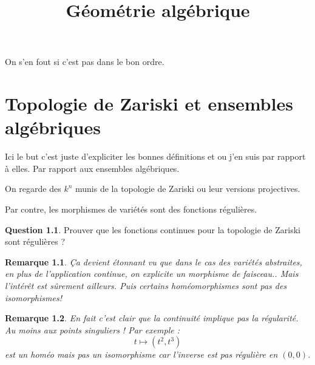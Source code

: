 \documentclass[a4paper,12pt]{book}
\title{Géométrie algébrique}
\date{}
\theoremstyle{plain}
\newtheorem{rem}{Remarque}
\theoremstyle{definition}
\newtheorem{quest}{Question}
\theoremstyle{remark}
\begin{document}
\maketitle
\tableofcontents


On s'en fout si c'est pas dans le bon ordre.
\chapter{Topologie de Zariski et ensembles algébriques}
Ici le but c'est juste d'expliciter les bonnes définitions et 
ou j'en suis par rapport à elles. Par rapport aux ensembles
algébriques. 
\begin{center}
    On regarde des $k^n$ munis de la topologie de Zariski
    ou leur versions projectives.
\end{center}
Par contre, les morphismes de variétés sont des fonctions régulières.
\begin{quest}
    Prouver que les fonctions continues pour la topologie de Zariski
    sont régulières ?
\end{quest}

\begin{rem}
    Ça devient étonnant vu que dans le cas des variétés abstraites,
    en plus de l'application continue, on explicite un morphisme de
    faisceau.. Mais l'intérêt est sûrement ailleurs. Puis certains 
    homéomorphismes sont pas des isomorphismes!
\end{rem}
\begin{rem}
    En fait c'est clair que la continuité implique pas la régularité.
    Au moins aux points singuliers ! Par exemple :
    \[t\mapsto (t^2, t^3)\]
    est un homéo mais pas un isomorphisme car l'inverse est pas régulière en
    $(0,0)$.
\end{rem}
\end{document}
